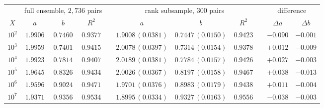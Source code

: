 \begin{tabular}{@{}c ccc c ccc c cc@{}}
\toprule
 & \multicolumn{3}{c}{full ensemble, $2{,}736$ pairs} & & \multicolumn{3}{c}{rank subsample, $300$ pairs} & & \multicolumn{2}{c}{difference}\\
\cmidrule{2-4}\cmidrule{6-8}\cmidrule{10-11}
$X$ & $a$ & $b$ & $R^{2}$ & & $a$ & $b$ & $R^{2}$ & & $\Delta a$ & $\Delta b$\\
\midrule
$10^{2}$ & $1.9906$ & $0.7460$ & $0.9377$ & & $1.9008\,(0.0381)$ & $0.7447\,(0.0150)$ & $0.9423$ & & $-0.090$ & $-0.001$\\
$10^{3}$ & $1.9959$ & $0.7401$ & $0.9415$ & & $2.0078\,(0.0397)$ & $0.7314\,(0.0154)$ & $0.9378$ & & $+0.012$ & $-0.009$\\
$10^{4}$ & $1.9923$ & $0.7814$ & $0.9407$ & & $2.0189\,(0.0381)$ & $0.7784\,(0.0157)$ & $0.9426$ & & $+0.027$ & $-0.003$\\
$10^{5}$ & $1.9645$ & $0.8326$ & $0.9434$ & & $2.0026\,(0.0367)$ & $0.8197\,(0.0158)$ & $0.9467$ & & $+0.038$ & $-0.013$\\
$10^{6}$ & $1.9596$ & $0.9024$ & $0.9471$ & & $1.9701\,(0.0376)$ & $0.8983\,(0.0179)$ & $0.9438$ & & $+0.011$ & $-0.004$\\
$10^{7}$ & $1.9371$ & $0.9356$ & $0.9534$ & & $1.8995\,(0.0334)$ & $0.9327\,(0.0163)$ & $0.9556$ & & $-0.038$ & $-0.003$\\
\bottomrule
\end{tabular}
